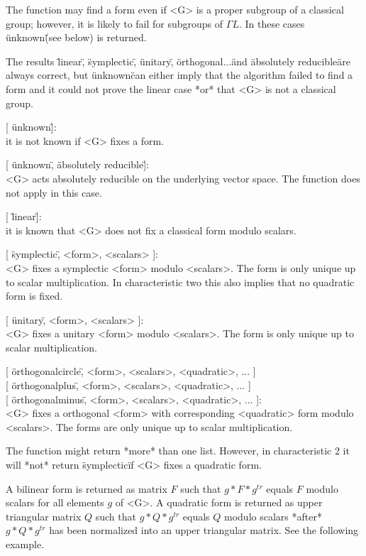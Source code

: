 The  function may find   a form even if <G>   is a  proper subgroup  of a
classical  group;   however, it  is  likely  to  fail   for subgroups  of
${\Gamma}L$.  In these cases \"unknown\" (see below) is returned.

The results  \"linear\", \"symplectic\",  \"unitary\",  \"orthogonal...\"
and \"absolutely  reducible\"  are always  correct,  but \"unknown\"  can
either imply that  the algorithm failed to find  a form and  it could not
prove the linear case *or* that <G> is not a classical group.

[ \"unknown\" ]:\\
    it is not known if <G> fixes a form.

[ \"unknown\", \"absolutely reducible\" ]:\\
    <G> acts absolutely reducible  on  the underlying vector space.   The
    function does not apply in this case.

[ \"linear\" ]:\\
    it is known that <G> does not fix a classical form modulo scalars.

[ \"symplectic\", <form>, <scalars> ]:\\
    <G> fixes  a symplectic  <form>  modulo <scalars>.  The form  is only
    unique up to scalar multiplication.  In  characteristic two this also
    implies that no quadratic form is fixed.

[ \"unitary\", <form>, <scalars> ]:\\
    <G> fixes a  unitary <form> modulo <scalars>.  The form is
    only unique up to scalar multiplication.

{}[ \"orthogonalcircle\", <form>, <scalars>, <quadratic>, ... ]\\
{}[ \"orthogonalplus\", <form>, <scalars>, <quadratic>, ... ] \\
{}[ \"orthogonalminus\", <form>, <scalars>, <quadratic>, ... ]:\\
    <G>   fixes a orthogonal  <form>  with corresponding <quadratic> form
    modulo <scalars>.    The forms  are    only  unique up   to    scalar
    multiplication.

The   function might    return  *more* than    one  list.   However,   in
characteristic  2  it will  *not*  return  \"symplectic\" if  <G> fixes a
quadratic form.

A  bilinear form is returned as   matrix $F$ such that   $g * F * g^{tr}$
equals $F$ modulo scalars for all elements $g$  of <G>.  A quadratic form
is returned as  upper triangular matrix  $Q$ such  that $g *  Q * g^{tr}$
equals $Q$ modulo scalars *after*  $g * Q  * g^{tr}$ has been  normalized
into an upper triangular matrix.  See the following example.

